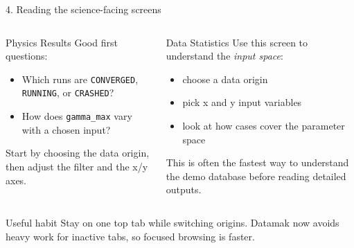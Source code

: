 \documentclass[aspectratio=169,11pt]{beamer}
\newcommand{\code}[1]{\texttt{#1}}
\begin{document}
\begin{frame}{4. Reading the science-facing screens}
  \footnotesize
  \begin{columns}[T]
    \begin{block}{Physics Results}
      Good first questions:
      \begin{itemize}
        \item Which runs are \code{CONVERGED}, \code{RUNNING}, or
        \code{CRASHED}?
        \item How does \code{gamma\_max} vary with a chosen input?
      \end{itemize}
      Start by choosing the data origin, then adjust the filter and the x/y axes.
    \end{block}

    \begin{block}{Data Statistics}
      Use this screen to understand the \emph{input space}:
      \begin{itemize}
        \item choose a data origin
        \item pick x and y input variables
        \item look at how cases cover the parameter space
      \end{itemize}
      This is often the fastest way to understand the demo database before reading detailed outputs.
    \end{block}
  \end{columns}

  \vspace{0.2em}
  \begin{block}{Useful habit}
    Stay on one top tab while switching origins. Datamak now avoids heavy work
    for inactive tabs, so focused browsing is faster.
  \end{block}
\end{frame}
\end{document}
